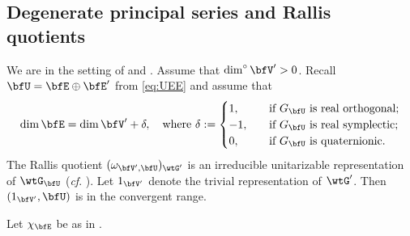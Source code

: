 \documentclass[12pt,a4paper]{amsart}
\numberwithin{equation}{section}
\theoremstyle{remark}
\def\abfV{\bfV'}
\def\dimo{\dim^\circ}
\def\tGVar{\wtG'}
\begin{document}
\subsection{Degenerate principal series and Rallis quotients}\label{sec:DPandRQ}

We are in the setting of  and . Assume that $\dimo \abfV>0$. Recall $\bfU=\bfE\oplus \bfE'$ from \eqref{eq:UEE}
and assume that
\begin{equation}
  \label{dimu}
  \dim \bfE =\dim \abfV+\delta , \quad  \textrm{where } \delta :=\begin{cases}
        1, \quad&\text{if $G_\bfU$ is real orthogonal;} \\
    -1,\quad& \text{if $G_\bfU$ is real symplectic;} \\
    0, \quad&\text{if $G_\bfU$ is quaternionic. }
  \end{cases}
\end{equation}
The Rallis quotient
$(\omega_{\abfV,\bfU})_{\tGVar}$ is an irreducible unitarizable
representation of $\wtG_{\bfU}$ (\emph{cf}. \cite{Ra,KR,Ya}).
Let $1_{\abfV}$ denote the trivial representation of $\tGVar$.  Then
$(1_{\abfV}, \bfU)$ is in the convergent range.

Let $\chi_{\bfE}$ be as in .


\end{document}
